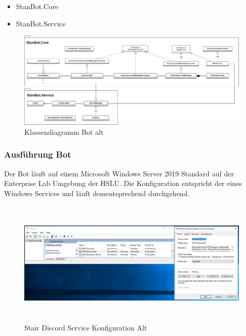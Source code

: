 \documentclass[a4paper, table]{article}
\begin{document}
\begin{itemize}
    \item StanBot.Core
    \item StanBot.Service
\end{itemize}
\clearpage
\begin{figure}[ht]
    \centering
    \hspace*{-1.5cm}
    \includegraphics[width=1.2\textwidth]{img/Klassendiagramm_Bot_alt.png}
    \caption{Klassendiagramm Bot alt}
    \label{fig:Klassendiagramm_Bot_alt}
\end{figure}

\subsubsection{Ausführung Bot}
Der Bot läuft auf einem Microsoft Windows Server 2019 Standard auf der Enterprise Lab Umgebung der HSLU. 
Die Konfiguration entspricht der eines Windows Services und läuft dementsprechend durchgehend.

\begin{figure}[hb]
    \centering
    \hspace*{-2.5cm}
    \includegraphics[width=1.3\textwidth,height=6cm]{img/Discord_Bot_old_service_configuration.png}
    \caption{Stair Discord Service Konfiguration Alt}
    \label{fig:bot-service-configuration-old}
\end{figure}
\clearpage
\end{document}
